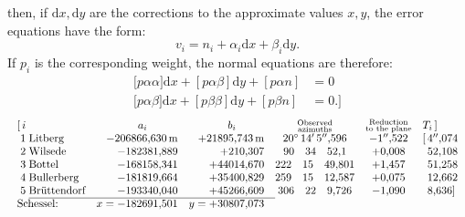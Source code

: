\noindent then, if \(\mathrm{d}x,\mathrm{d}y\) are the corrections to the approximate values \(x,y\), the error equations have the form:
\[
 v_i=n_i+\alpha_i\mathrm{d}x+\beta_i\mathrm{d}y.
\]
If \(p_i\) is the corresponding weight, the normal equations are therefore:
\[
\begin{aligned}
 {[}p\alpha\alpha]\mathrm{d}x+[p\alpha\beta]\mathrm{d}y+[p\alpha n]&=0\\
 {[}p\alpha\beta]\mathrm{d}x+[p\beta\beta]\mathrm{d}y+[p\beta n]&=0.]
\end{aligned}
\]
\[
\resizebox{\linewidth}{!}{\(\begin{array}{@{}r@{\;}l@{\quad}r@{\quad}r@{\quad}c@{\quad}c@{\quad}l@{}}
 [\,i&&\multicolumn{1}{c}{a_i}&\multicolumn{1}{c}{b_i}&
 \substack{\text{Observed}\\\text{azimuths}}&
 \substack{\text{Reduction}\\\text{to the plane}}&T_i\,]\\
 1&\text{Litberg}&-206866{,}630\,\mathrm{m}&+21895{,}743\,\mathrm{m}
 &20^\circ\,14'\,5''{,}596&-1''{,}522&[\,4''{,}074\\
 2&\text{Wilsede}&-182381{,}889&+210{,}307&90\quad34\quad52{,}1&+0{,}008&\phantom{[\,}52{,}108\\
 3&\text{Bottel}&-168158{,}341&+44014{,}670&222\quad15\quad49{,}801&+1{,}457&\phantom{[\,}51{,}258\\
 4&\text{Bullerberg}&-181819{,}664&+35400{,}829&259\quad15\quad12{,}587&+0{,}075&\phantom{[\,}12{,}662\\
 5&\text{Brüttendorf}&-193340{,}040&+45266{,}609&306\quad22\quad9{,}726&-1{,}090&\phantom{[\,}8{,}636]\\
 \cline{2-4}
 \multicolumn{2}{@{}l}{\text{Schessel:}}&x=-182691{,}501&y=+30807{,}073&&&
\end{array}\)}
\]
